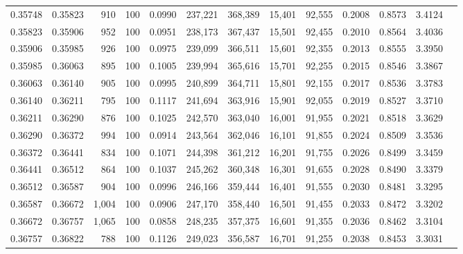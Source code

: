 \begin{tabular}{rrrrrrrrrrrrr}
0.35748 & 0.35823 &   910 & 100 &                                     0.0990 & 237,221 & 368,389 &  15,401 &  92,555 & 0.2008 & 0.8573 & 3.4124 \\
0.35823 & 0.35906 &   952 & 100 &                                     0.0951 & 238,173 & 367,437 &  15,501 &  92,455 & 0.2010 & 0.8564 & 3.4036 \\
0.35906 & 0.35985 &   926 & 100 &                                     0.0975 & 239,099 & 366,511 &  15,601 &  92,355 & 0.2013 & 0.8555 & 3.3950 \\
0.35985 & 0.36063 &   895 & 100 &                                     0.1005 & 239,994 & 365,616 &  15,701 &  92,255 & 0.2015 & 0.8546 & 3.3867 \\
0.36063 & 0.36140 &   905 & 100 &                                     0.0995 & 240,899 & 364,711 &  15,801 &  92,155 & 0.2017 & 0.8536 & 3.3783 \\
0.36140 & 0.36211 &   795 & 100 &                                     0.1117 & 241,694 & 363,916 &  15,901 &  92,055 & 0.2019 & 0.8527 & 3.3710 \\
0.36211 & 0.36290 &   876 & 100 &                                     0.1025 & 242,570 & 363,040 &  16,001 &  91,955 & 0.2021 & 0.8518 & 3.3629 \\
0.36290 & 0.36372 &   994 & 100 &                                     0.0914 & 243,564 & 362,046 &  16,101 &  91,855 & 0.2024 & 0.8509 & 3.3536 \\
0.36372 & 0.36441 &   834 & 100 &                                     0.1071 & 244,398 & 361,212 &  16,201 &  91,755 & 0.2026 & 0.8499 & 3.3459 \\
0.36441 & 0.36512 &   864 & 100 &                                     0.1037 & 245,262 & 360,348 &  16,301 &  91,655 & 0.2028 & 0.8490 & 3.3379 \\
0.36512 & 0.36587 &   904 & 100 &                                     0.0996 & 246,166 & 359,444 &  16,401 &  91,555 & 0.2030 & 0.8481 & 3.3295 \\
0.36587 & 0.36672 & 1,004 & 100 &                                     0.0906 & 247,170 & 358,440 &  16,501 &  91,455 & 0.2033 & 0.8472 & 3.3202 \\
0.36672 & 0.36757 & 1,065 & 100 &                                     0.0858 & 248,235 & 357,375 &  16,601 &  91,355 & 0.2036 & 0.8462 & 3.3104 \\
0.36757 & 0.36822 &   788 & 100 &                                     0.1126 & 249,023 & 356,587 &  16,701 &  91,255 & 0.2038 & 0.8453 & 3.3031 \\

\end{tabular}
